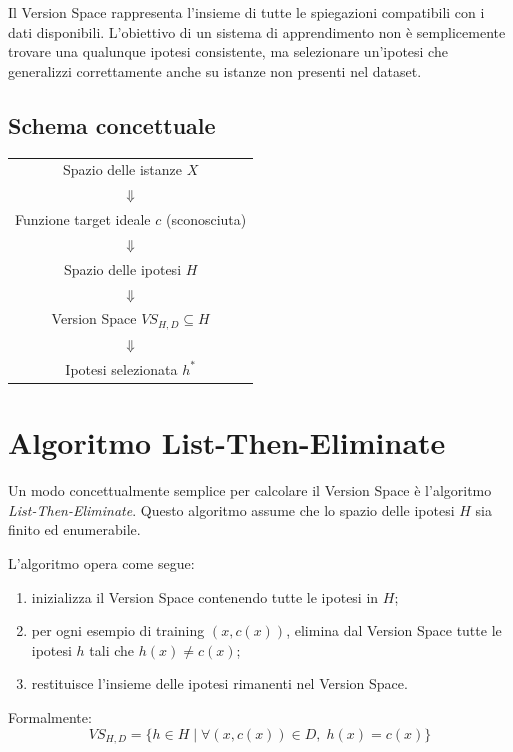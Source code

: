 \documentclass[a4paper,12pt]{report}
\begin{document}
Il Version Space rappresenta l’insieme di tutte le spiegazioni compatibili con i dati disponibili.
L’obiettivo di un sistema di apprendimento non è semplicemente trovare una qualunque ipotesi consistente, ma selezionare un’ipotesi che generalizzi correttamente anche su istanze non presenti nel dataset.

\subsection*{Schema concettuale}

\begin{center}
\begin{tabular}{c}
Spazio delle istanze \( X \) \\
\(\Downarrow\) \\
Funzione target ideale \( c \) (sconosciuta) \\
\(\Downarrow\) \\
Spazio delle ipotesi \( H \) \\
\(\Downarrow\) \\
Version Space \( VS_{H,D} \subseteq H \) \\
\(\Downarrow\) \\
Ipotesi selezionata \( h^* \)
\end{tabular}
\end{center}

\section{Algoritmo List-Then-Eliminate}

Un modo concettualmente semplice per calcolare il Version Space è l’algoritmo \textit{List-Then-Eliminate}.
Questo algoritmo assume che lo spazio delle ipotesi \( H \) sia finito ed enumerabile.

L’algoritmo opera come segue:
\begin{enumerate}
    \item inizializza il Version Space contenendo tutte le ipotesi in \( H \);
    \item per ogni esempio di training \( (x, c(x)) \), elimina dal Version Space tutte le ipotesi \( h \) tali che \( h(x) \neq c(x) \);
    \item restituisce l’insieme delle ipotesi rimanenti nel Version Space.
\end{enumerate}

Formalmente:
\[
VS_{H,D} = \{ h \in H \mid \forall (x, c(x)) \in D,\; h(x) = c(x) \}
\]
\end{document}
